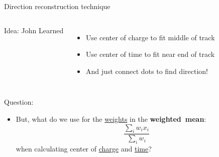 \documentclass[14pt]{beamer}
\begin{document}
\begin{frame}{Direction reconstruction technique}
\begin{columns}[t]
\begin{block}{}

			{\footnotesize Idea: John Learned}
		\end{block}
		\begin{itemize}
			\item<2-> Use {\color{magenta}center of charge} to fit middle of
				track
			\item<3-> Use {\color{blue}center of time} to fit near end of track
			\item<4-> And just connect dots to find direction!
		\end{itemize}
	\end{columns}
\end{frame}

\begin{frame}{Question:}
	\begin{itemize}
		\item<2-> {
				But, what do we use for the \underline{weights} in the
				\textbf{weighted~mean}:
				\begin{equation*}
					\frac{\sum_{i} w_{i}x_{i}}{\sum_{i} w_{i}}
				\end{equation*}
				when calculating center of {\color{magenta}\underline{charge}} and
				{\color{blue}\underline{time}}?
			}
	\end{itemize}
\end{frame}
\end{document}
